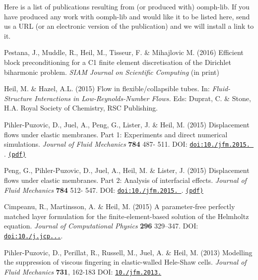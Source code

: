 Here is a list of publications resulting from (or produced with) {\ttfamily oomph-\/lib}. If you have produced any work with {\ttfamily oomph-\/lib} and would like it to be listed here, send us a U\+RL (or an electronic version of the publication) and we will install a link to it.


\begin{DoxyItemize}
\item Pestana, J., Muddle, R., Heil, M., Tisseur, F. \& Mihajlovic M. (2016) Efficient block preconditioning for a C1 finite element discretisation of the Dirichlet biharmonic problem. {\itshape S\+I\+AM Journal on Scientific Computing} (in print)
\item Heil, M. \& Hazel, A.\+L. (2015) Flow in flexible/collapsible tubes. In\+: {\itshape Fluid-\/\+Structure Interactions in Low-\/\+Reynolds-\/\+Number Flows.} Eds\+: Duprat, C. \& Stone, H.\+A. Royal Society of Chemistry, R\+SC Publishing.
\item Pihler-\/\+Puzovic, D., Juel, A., Peng, G., Lister, J. \& Heil, M. (2015) Displacement flows under elastic membranes. Part 1\+: Experiments and direct numerical simulations. {\itshape Journal of Fluid Mechanics} {\bfseries 784} 487-\/ 511. D\+OI\+: \href{http://dx.doi.org/10.1017/jfm.2015.590}{\tt doi\+:10./jfm.2015. }. \href{http://www.maths.man.ac.uk/~mheil/MATTHIAS/PDF/DragaAxisymPart1.pdf}{\tt (pdf)}
\item Peng, G., Pihler-\/\+Puzovic, D., Juel, A., Heil, M. \& Lister, J. (2015) Displacement flows under elastic membranes. Part 2\+: Analysis of interfacial effects. {\itshape Journal of Fluid Mechanics} {\bfseries 784} 512-\/ 547. D\+OI\+: \href{http://dx.doi.org/10.1017/jfm.2015.589}{\tt doi\+:10./jfm.2015. }. \href{http://www.maths.man.ac.uk/~mheil/MATTHIAS/PDF/DragaAxisymPart2.pdf}{\tt (pdf)}
\item Cimpeanu, R., Martinsson, A. \& Heil, M. (2015) A parameter-\/free perfectly matched layer formulation for the finite-\/element-\/based solution of the Helmholtz equation. {\itshape Journal of Computational Physics} {\bfseries 296} 329–347. D\+OI\+: \href{http://www.sciencedirect.com/science/article/pii/S0021999115003241}{\tt doi\+:10./j.jcp...}.
\item Pihler-\/\+Puzovic, D., Perillat, R., Russell, M., Juel, A. \& Heil, M. (2013) Modelling the suppression of viscous fingering in elastic-\/walled Hele-\/\+Shaw cells. {\itshape Journal of Fluid Mechanics} {\bfseries 731}, 162-\/183 D\+OI\+: \href{http://dx.doi.org/10.1017/jfm.2013.375}{\tt 10./jfm.2013.}

\end{DoxyItemize}
